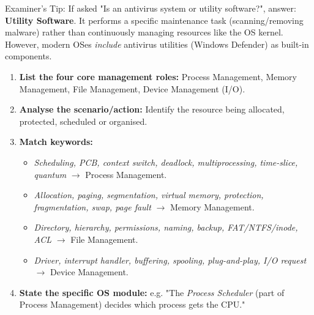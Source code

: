 \documentclass[11pt]{article}
\newcommand{\cle}[1]{{\popxbold\color{popdark}#1}}
\begin{document}
\begin{exoresolu}
\cle{Examiner's Tip:} If asked "Is an antivirus system or utility software?", answer: \textbf{Utility Software}. It performs a specific maintenance task (scanning/removing malware) rather than continuously managing resources like the OS kernel. However, modern OSes \emph{include} antivirus utilities (Windows Defender) as built-in components.
\end{exoresolu}

\begin{methode}
\begin{enumerate}
\item \textbf{List the four core management roles:} \cle{Process Management}, \cle{Memory Management}, \cle{File Management}, \cle{Device Management} (I/O).
\item \textbf{Analyse the scenario/action:} Identify the resource being allocated, protected, scheduled or organised.
\item \textbf{Match keywords:}
\begin{itemize}
    \item \emph{Scheduling, PCB, context switch, deadlock, multiprocessing, time-slice, quantum} $\rightarrow$ Process Management.
    \item \emph{Allocation, paging, segmentation, virtual memory, protection, fragmentation, swap, page fault} $\rightarrow$ Memory Management.
    \item \emph{Directory, hierarchy, permissions, naming, backup, FAT/NTFS/inode, ACL} $\rightarrow$ File Management.
    \item \emph{Driver, interrupt handler, buffering, spooling, plug-and-play, I/O request} $\rightarrow$ Device Management.
\end{itemize}
\item \textbf{State the specific OS module:} e.g. "The \emph{Process Scheduler} (part of Process Management) decides which process gets the CPU."
\end{enumerate}
\end{methode}
\end{document}
